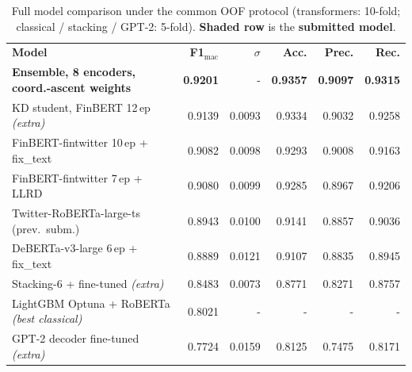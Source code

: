 \documentclass[11pt,a4paper]{article}
\newcommand{\tH}[1]{\textcolor{maincolor}{\textbf{#1}}}
\newcommand{\gmid}{\arrayrulecolor{maincolor}\midrule\arrayrulecolor{black}}
\begin{document}
\begin{table}[H]
  \centering\footnotesize\setlength{\tabcolsep}{5pt}
  \begin{tabularx}{\linewidth}{@{}>{\raggedright\arraybackslash}X r r r r r@{}}
    \toprule
    \tH{Model} & \tH{F1$_{\text{mac}}$} & \tH{$\sigma$} & \tH{Acc.} & \tH{Prec.} & \tH{Rec.} \\
    \gmid
    \rowcolor{lightgray}\textbf{Ensemble, 8 encoders, coord.-ascent weights} & \textbf{0.9201} & - & \textbf{0.9357} & \textbf{0.9097} & \textbf{0.9315} \\
    KD student, FinBERT 12\,ep \emph{(extra)}    & 0.9139 & 0.0093 & 0.9334 & 0.9032 & 0.9258 \\
    FinBERT-fintwitter 10\,ep + fix\_text         & 0.9082 & 0.0098 & 0.9293 & 0.9008 & 0.9163 \\
    FinBERT-fintwitter 7\,ep + LLRD               & 0.9080 & 0.0099 & 0.9285 & 0.8967 & 0.9206 \\
    Twitter-RoBERTa-large-ts (prev.\ subm.)       & 0.8943 & 0.0100 & 0.9141 & 0.8857 & 0.9036 \\
    DeBERTa-v3-large 6\,ep + fix\_text            & 0.8889 & 0.0121 & 0.9107 & 0.8835 & 0.8945 \\
    Stacking-6 + fine-tuned \emph{(extra)}        & 0.8483 & 0.0073 & 0.8771 & 0.8271 & 0.8757 \\
    LightGBM Optuna + RoBERTa \emph{(best classical)} & 0.8021 & - & - & - & - \\
    GPT-2 decoder fine-tuned \emph{(extra)}       & 0.7724 & 0.0159 & 0.8125 & 0.7475 & 0.8171 \\
    \bottomrule
  \end{tabularx}
  \caption{Full model comparison under the common OOF protocol (transformers: 10-fold;
  classical / stacking / GPT-2: 5-fold). \textbf{Shaded row} is the \textbf{submitted model}.}
  \label{tab:results}
\end{table}
\end{document}
